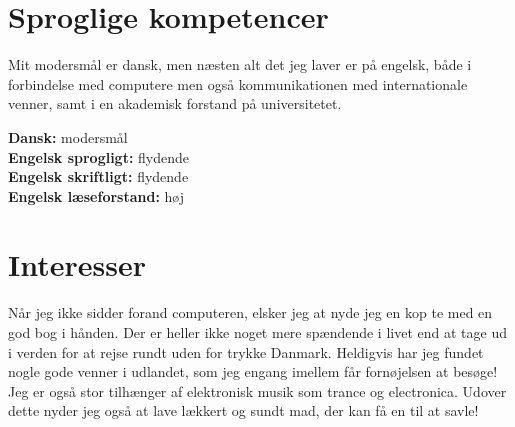 \documentclass[margin,line,a4paper]{resume}
\begin{document}
\begin{resume}
\begin{description}
\end{description}

\section{\mysidestyle Sproglige kompetencer}
Mit modersmål er dansk, men næsten alt det jeg laver er på engelsk,
både i forbindelse med computere men også kommunikationen med
internationale venner, samt i en akademisk forstand på universitetet.

\textbf{Dansk:} modersmål\\
\textbf{Engelsk sprogligt:} flydende\\
\textbf{Engelsk skriftligt:} flydende\\
\textbf{Engelsk læseforstand:} høj\\

\section{\mysidestyle Interesser}

Når jeg ikke sidder forand computeren, elsker jeg at nyde jeg en kop 
te med en god bog i hånden. Der er heller ikke noget
mere spændende i livet end at tage ud i verden for at rejse rundt uden
for trykke Danmark. Heldigvis har jeg fundet nogle gode venner i udlandet, som jeg engang imellem får fornøjelsen at besøge! Jeg er også stor tilhænger af elektronisk musik som trance og electronica. Udover dette nyder jeg også at lave lækkert og sundt mad, der kan få en til at savle!


\end{resume}
\end{document}
